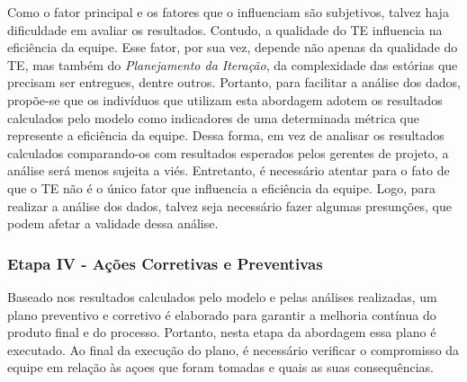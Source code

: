 Como o fator principal e os fatores que o influenciam são subjetivos, talvez haja dificuldade em avaliar os resultados. Contudo, a qualidade do TE influencia na eficiência da equipe. Esse fator, por sua vez, depende não apenas da qualidade do TE, mas também do \textit{Planejamento da Iteração}, da complexidade das estórias que precisam ser entregues, dentre outros. Portanto, para facilitar a análise dos dados, propõe-se que os indivíduos que utilizam esta abordagem adotem os resultados calculados pelo modelo como indicadores de uma determinada métrica que represente a eficiência da equipe. Dessa forma, em vez de analisar os resultados calculados comparando-os com resultados esperados pelos gerentes de projeto, a análise será menos sujeita a viés. Entretanto, é necessário atentar para o fato de que o TE não é o único fator que influencia a eficiência da equipe. Logo, para realizar a análise dos dados, talvez seja necessário fazer algumas presunções, que podem afetar a validade dessa análise.


\subsubsection{Etapa IV - Ações Corretivas e Preventivas}
\label{descricao:acoes}

Baseado nos resultados calculados pelo modelo e pelas análises realizadas, um plano preventivo e corretivo é elaborado para garantir a melhoria contínua do produto final e do processo. Portanto, nesta etapa da abordagem essa plano é executado. Ao final da execução do plano, é necessário verificar o compromisso da equipe em relação às açoes que foram tomadas e quais as suas consequências. 